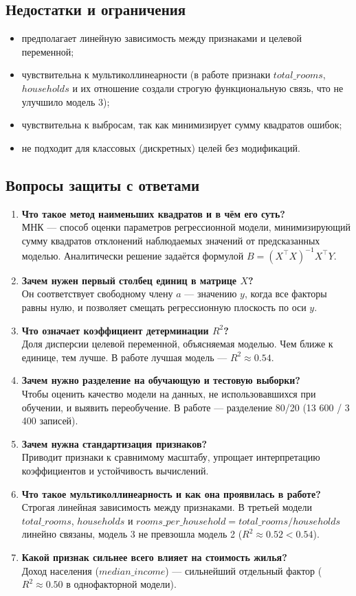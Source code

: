 \documentclass[12pt,a4paper]{article}
\begin{document}
\subsection{Недостатки и ограничения}
\begin{itemize}
\item предполагает линейную зависимость между признаками и целевой переменной;
\item чувствительна к мультиколлинеарности (в работе признаки $total\_rooms$, $households$ и их отношение создали строгую функциональную связь, что не улучшило модель 3);
\item чувствительна к выбросам, так как минимизирует сумму квадратов ошибок;
\item не подходит для классовых (дискретных) целей без модификаций.
\end{itemize}

\subsection{Вопросы защиты с ответами}
\begin{enumerate}
\item \textbf{Что такое метод наименьших квадратов и в чём его суть?}\\
МНК --- способ оценки параметров регрессионной модели, минимизирующий сумму квадратов отклонений наблюдаемых значений от предсказанных моделью. Аналитически решение задаётся формулой $B = (X^\top X)^{-1}X^\top Y$.
\item \textbf{Зачем нужен первый столбец единиц в матрице $X$?}\\
Он соответствует свободному члену $a$ --- значению $y$, когда все факторы равны нулю, и позволяет смещать регрессионную плоскость по оси $y$.
\item \textbf{Что означает коэффициент детерминации $R^2$?}\\
Доля дисперсии целевой переменной, объясняемая моделью. Чем ближе к единице, тем лучше. В работе лучшая модель --- $R^2 \approx 0.54$.
\item \textbf{Зачем нужно разделение на обучающую и тестовую выборки?}\\
Чтобы оценить качество модели на данных, не использовавшихся при обучении, и выявить переобучение. В работе --- разделение 80/20 (13 600 / 3 400 записей).
\item \textbf{Зачем нужна стандартизация признаков?}\\
Приводит признаки к сравнимому масштабу, упрощает интерпретацию коэффициентов и устойчивость вычислений.
\item \textbf{Что такое мультиколлинеарность и как она проявилась в работе?}\\
Строгая линейная зависимость между признаками. В третьей модели $total\_rooms$, $households$ и $rooms\_per\_household = total\_rooms/households$ линейно связаны, модель 3 не превзошла модель 2 ($R^2 \approx 0.52 < 0.54$).
\item \textbf{Какой признак сильнее всего влияет на стоимость жилья?}\\
Доход населения ($median\_income$) --- сильнейший отдельный фактор ($R^2 \approx 0.50$ в однофакторной модели).
\end{enumerate}
\end{document}
